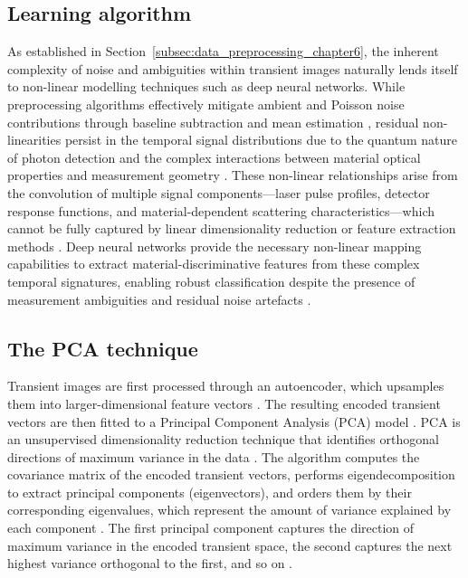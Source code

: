 \documentclass[12pt,a4paper,oneside]{report}
\begin{document}
\subsection{Learning algorithm}
\label{subsec:learning_algorithm_chapter6}

As established in Section~\ref{subsec:data_preprocessing_chapter6}, the inherent complexity of noise and ambiguities within transient images naturally lends itself to non-linear modelling techniques such as deep neural networks. While preprocessing algorithms effectively mitigate ambient and Poisson noise contributions through baseline subtraction and mean estimation \cite{tontini2020}, residual non-linearities persist in the temporal signal distributions due to the quantum nature of photon detection and the complex interactions between material optical properties and measurement geometry \cite{jungerman2022,tontini2024}. These non-linear relationships arise from the convolution of multiple signal components—laser pulse profiles, detector response functions, and material-dependent scattering characteristics—which cannot be fully captured by linear dimensionality reduction or feature extraction methods \cite{lecun1998,su2016}. Deep neural networks provide the necessary non-linear mapping capabilities to extract material-discriminative features from these complex temporal signatures, enabling robust classification despite the presence of measurement ambiguities and residual noise artefacts \cite{ackley1985,bishop2006}.

\subsection{The PCA technique}
\label{subsec:the_pca_technique}

Transient images are first processed through an autoencoder, which upsamples them into larger-dimensional feature vectors \cite{ackley1985,lecun1998,su2016}. The resulting encoded transient vectors are then fitted to a Principal Component Analysis (PCA) model \cite{wold1987,chandra2024}. PCA is an unsupervised dimensionality reduction technique that identifies orthogonal directions of maximum variance in the data \cite{wold1987,bishop2006}. The algorithm computes the covariance matrix of the encoded transient vectors, performs eigendecomposition to extract principal components (eigenvectors), and orders them by their corresponding eigenvalues, which represent the amount of variance explained by each component \cite{wold1987}. The first principal component captures the direction of maximum variance in the encoded transient space, the second captures the next highest variance orthogonal to the first, and so on \cite{bishop2006}.
\end{document}

